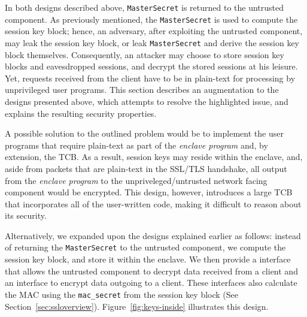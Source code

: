 \documentclass[../../main.tex]{subfiles}
\begin{document}
In both designs described above, \texttt{MasterSecret} is returned to
the untrusted component. As previously mentioned, the
\texttt{MasterSecret} is used to compute the session key block; hence,
an adversary, after exploiting the untrusted component, may leak the
session key block, or leak \texttt{MasterSecret} and derive the
session key block themselves. Consequently, an attacker may choose
to store session key blocks and eavesdropped sessions, and decrypt the
stored sessions at his leisure. Yet, requests received from the client
have to be in plain-text for processing by unprivileged user programs.
This section describes an augmentation to the designs presented above,
which attempts to resolve the highlighted issue, and explains the
resulting security properties.

A possible solution to the outlined problem would be to implement the
user programs that require plain-text as part of the \textit{enclave
  program} and, by extension, the TCB. As a result, session keys may
reside within the enclave, and, aside from packets that are plain-text
in the SSL/TLS handshake, all output from the \textit{enclave program}
to the unpriveleged/untrusted network facing component would be
encrypted. This design, however, introduces a large TCB that
incorporates all of the user-written code, making it difficult to
reason about its security.

Alternatively, we expanded upon the designs explained earlier as
follows: instead of returning the \texttt{MasterSecret} to the
untrusted component, we compute the session key block, and store it
within the enclave. We then provide a interface that allows the
untrusted component to decrypt data received from a client and an
interface to encrypt data outgoing to a client. These interfaces also
calculate the MAC using the \texttt{mac\_secret} from the session key
block (See Section~\ref{sec:ssloverview}).
Figure~\ref{fig:keys-inside} illustrates this design.
\end{document}
